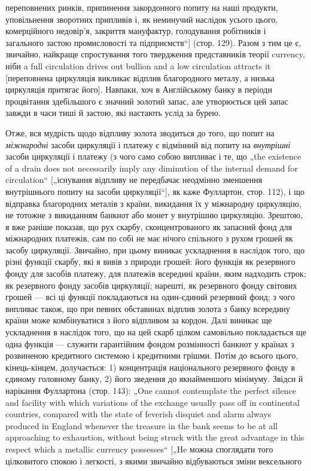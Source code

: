 \parcont{}  %
переповнених ринків, припинення закордонного попиту на наші
продукти, уповільнення зворотних припливів і, як неминучий
наслідок усього цього, комерційного недовір’я, закриття мануфактур,
голодування робітників і загального застою промисловості
та підприємств“] (стор. 129). Разом з тим це є, звичайно,
найкраще спростування того твердження представників теорії
currency, ніби a full circulation drives out bullion and a low circulation
attracts it [переповнена циркуляція викликає відплив благородного
металу, а низька циркуляція притягає його]. Навпаки,
хоч в Англійському банку в періоди процвітання здебільшого є
значний золотий запас, але утворюється цей запас завжди в часи
тиші й застою, які настають услід за бурею.

Отже, вся мудрість щодо відпливу золота зводиться до того,
що попит на \emph{міжнародні} засоби циркуляції і платежу є відмінний
від попиту на \emph{внутрішні} засоби циркуляції і платежу (з чого
само собою випливає і те, що „the existence of a drain does not
necessarily imply any diminution of the internal demand for circulation“
[„існування відпливу не передбачає неодмінно зменшення
внутрішнього попиту на засоби циркуляції“], як каже Фуллартон,
стор. 112), і що відправка благородних металів з країни,
викидання їх у міжнародну циркуляцію, не тотожне з викиданням
банкнот або монет у внутрішню циркуляцію. Зрештою,
я вже раніше показав, що рух скарбу, сконцентрованого як запасний
фонд для міжнародних платежів, сам по собі не має
нічого спільного з рухом грошей як засобу циркуляції. Звичайно,
при цьому виникає ускладнення в наслідок того, що різні функції
скарбу, які я вивів з природи грошей: його функція як резервного
фонду для засобів платежу, для платежів всередині
країни, яким надходить строк; як резервного фонду засобів циркуляції;
нарешті, як резервного фонду світових грошей — всі ці
функції покладаються на один-єдиний резервний фонд; з чого випливає
також, що при певних обставинах відплив золота з банку
всередину країни може комбінуватися з його відпливом за кордон.
Далі виникає ще ускладнення в наслідок того, що на цей скарб
цілком самовільно покладається ще одна функція — служити гарантійним
фондом розмінності банкнот у країнах з розвиненою
кредитного системою і кредитними грішми. Потім до всього
цього, кінець-кінцем, долучається: 1) концентрація національного
резервного фонду в єдиному головному банку, 2) його зведення
до якнайменшого мінімуму. Звідси й нарікання Фуллартона
(стор. 143): „One cannot contemplate the perfect silence and facility
with which variations of the exchange usually pass off in continental
countries, compared with the state of feverish disquiet and
alarm always produced in England whenever the treasure in the
bank seems to be at all approaching to exhaustion, without being
struck with the great advantage in this respect which a metallic currency
possesses“ [„He можна споглядати того цілковитого спокою
і легкості, з якими звичайно відбуваються зміни вексельного
\parbreak{}  %
